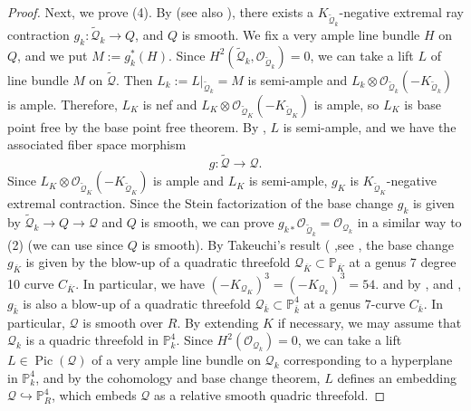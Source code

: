 \documentclass[autodetect-engine, a4paper]{amsart}
\theoremstyle{definition}
\def\P{{\mathbb P}}
\def\cO{\mathcal{O}}
\DeclareMathOperator\Pic{\mathrm{Pic}}
\begin{document}
\begin{proof}
Next, we prove (4).
By \cite[Theorem 1.1]{Kollarsmooth} (see also \cite[Theorem 7.4]{Tanaka2}), 
there exists a 
$K_{\widetilde{\mathcal{Q}}_{k}}$-negative extremal ray contraction $g_{k}\colon \widetilde{\mathcal{Q}}_{k} \rightarrow Q$, 
and $Q$ is smooth.
We fix a very ample line bundle $H$ on $Q$, and we
put $M := g_{k}^{\ast} (H)$.
Since $H^2(\widetilde{\mathcal{Q}}_{k}, \cO_{\widetilde{\mathcal{Q}}_{k}}) =0$, we can take a lift $L$ of line bundle $M$ on $\widetilde{\mathcal{Q}}$.
Then $L_{k}:=L|_{\widetilde{\mathcal{Q}}_{k}} = M$ is semi-ample and $L_{k}\otimes \cO_{\widetilde{\mathcal{Q}}_{k}} (-K_{\widetilde{\mathcal{Q}}_{k}})$ is ample.
Therefore, $L_{K}$ is nef and $L_{K} \otimes \cO_{\widetilde{\mathcal{Q}}_{K}} (-K_{\widetilde{\mathcal{Q}}_{K}})$ is ample, so $L_{K}$ is base point free by the base point free theorem.
By \cite[Theorem 1.2]{Witaszek}, $L$ is semi-ample, and we have the associated fiber space morphism
\[
g \colon \widetilde{\mathcal{Q}} \rightarrow \mathcal{Q}.
\]
Since $L_{K} \otimes \cO_{\widetilde{\mathcal{Q}}_{K}} (-K_{\widetilde{\mathcal{Q}}_{K}})$ is ample and $L_{K}$ is semi-ample, $g_{K}$ is $K_{\widetilde{\mathcal{Q}}_{K}}$-negative extremal contraction.
Since the Stein factorization of the base change $g_k$ is given by $\widetilde{\mathcal{Q}}_{k} \rightarrow Q \rightarrow \mathcal{Q}$ and $Q$ is smooth, we can prove $g_{k \ast} \cO_{\widetilde{\mathcal{Q}}_{k}} = \cO_{\mathcal{Q}_{k}}$
in a similar way to (2) (we can use \cite{Chatzistamatiou-Rulling} since $Q$ is smooth).
By Takeuchi's result (\cite{Takeuchi} ,see \cite[Theorem 4.4.11]{Iskovskikh-Prokhorov}, the base change $g_{\overline{K}}$ is given by the blow-up of a quadratic threefold $\mathcal{Q}_{\overline{K}} \subset \P_{\overline{K}}$ at a genus 7 degree 10 curve $C_{\overline{K}}$.
In particular, we have $(-K_{\mathcal{Q}_{K}})^3 = (-K_{\mathcal{Q}_{k}})^3 =54$.
and by \cite[Theorem 2.16]{Tanaka1} ,\cite[Theorem 7.4]{Tanaka2} and \cite[Theorem 1.1]{Kollarsmooth}, $g_{\overline{k}}$ is also a blow-up of a quadratic threefold $ \mathcal{Q}_{\overline{k}} \subset \P_{\overline{k}}^4$ at a genus $7$-curve $C_{\overline{k}}$.
In particular, $\mathcal{Q}$ is smooth over $R$.
By extending $K$ if necessary, we may assume that $\mathcal{Q}_{k}$ is a quadric threefold in $\P^4_{k}$.
Since $H^2(\cO_{\mathcal{Q}_k}) = 0$, we can take a lift $L \in \Pic (\mathcal{Q})$ of a very ample line bundle on $\mathcal{Q}_{k}$ corresponding to a hyperplane in $\P^4_{k}$, and by the cohomology and base change theorem, $L$ defines an embedding $\mathcal{Q} \hookrightarrow \P^4_{R}$, which embeds $\mathcal{Q}$ as a relative smooth quadric threefold.


\end{proof}
\end{document}
